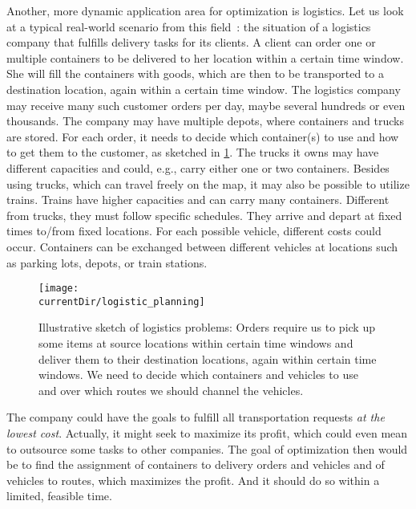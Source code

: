 %
%
\label{sec:intro:logistics}%
%
Another, more dynamic application area for optimization is logistics.
Let us look at a typical real-world scenario from this field~\cite{WPG2009SRWVRPWEA,WPRGG2009EFTP}: the situation of a logistics company that fulfills delivery tasks for its clients.
A client can order one or multiple containers to be delivered to her location within a certain time window.
She will fill the containers with goods, which are then to be transported to a destination location, again within a certain time window.
The logistics company may receive many such customer orders per day, maybe several hundreds or even thousands.
The company may have multiple depots, where containers and trucks are stored.
For each order, it needs to decide which container(s) to use and how to get them to the customer, as sketched in \cref{fig:logistic_planning}.
The trucks it owns may have different capacities and could, e.g., carry either one or two containers.
Besides using trucks, which can travel freely on the map, it may also be possible to utilize trains.
Trains have higher capacities and can carry many containers.
Different from trucks, they must follow specific schedules.
They arrive and depart at fixed times to/from fixed locations.
For each possible vehicle, different costs could occur.
Containers can be exchanged between different vehicles at locations such as parking lots, depots, or train stations.%
%
\begin{figure}%
\centering%
\texttt{[image: \\currentDir/logistic\_planning]}%
\caption{Illustrative sketch of logistics problems: Orders require us to pick up some items at source locations within certain time windows and deliver them to their destination locations, again within certain time windows. We need to decide which containers and vehicles to use and over which routes we should channel the vehicles.}
\label{fig:logistic_planning}
\end{figure}

The company could have the goals to fulfill all transportation requests \emph{at the lowest cost}.
Actually, it might seek to maximize its profit, which could even mean to outsource some tasks to other companies.
The goal of optimization then would be to find the assignment of containers to delivery orders and vehicles and of vehicles to routes, which maximizes the profit.
And it should do so within a limited, feasible time.

